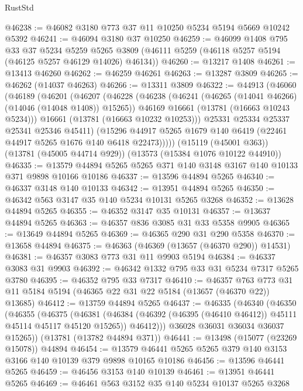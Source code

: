 \begin{lexlean}{RustStd}
\begin{coremodule}
@46238 := @46082 @3180 @773 @37 @11 @10250 @5234 @5194 @5669 @10242 @5392
@46241 := @46094 @3180 @37 @10250
@46259 := @46099
    @1408
    @795
    @33
    @37
    @5234
    @5259
    @5265
    @3809
    (@46111 @5259 (@46118 @5257 @5194 (@46125 @5257 @46129 @14026) @46134))
@46260 := @13217 @1408
@46261 := @13413 @46260
@46262 := @46259 @46261
@46263 := @13287 @3809
@46265 := @46262 (@14037 @46263)
@46266 := @13311 @3809
@46322 := @44913
    (@46060
      (@46189
        (@46201
          (@46207
            (@46228
              (@46238
                (@46241 (@46265 (@14041 @46266) (@14046 (@14048 @1408)) @15265))
                @46169
                @16661
                (@13781 (@16663 @10243 @5234)))
              @16661
              (@13781 (@16663 @10232 @10253)))
            @25331
            @25334
            @25337
            @25341
            @25346
            @45411)
          (@15296 @44917 @5265 @1679 @140 @6419 (@22461 @44917 @5265 @1676 @140 @6418 @22473)))))
    (@15119 (@45001 @363))
    (@13781 (@45005 @44714 @929))
    (@13573 (@15384 @1076 @10122 @44910))
@46335 := @13579 @44894 @5265 @5265 @371 @140 @3148 @3167 @140 @10133 @371 @9898 @10166 @10186
@46337 := @13596 @44894 @5265
@46340 := @46337 @3148 @140 @10133
@46342 := @13951 @44894 @5265
@46350 := @46342 @563 @3147 @35 @140 @5234 @10131 @5265 @3268
@46352 := @13628 @44894 @5265
@46355 := @46352 @3147 @35 @10131
@46357 := @13637 @44894 @5265
@46363 := @46357 @836 @3085 @31 @33 @5358 @9905
@46365 := @13649 @44894 @5265
@46369 := @46365 @290 @31 @290 @5358
@46370 := @13658 @44894
@46375 := @46363 (@46369 (@13657 (@46370 @290)) @14531)
@46381 := @46357 @3083 @773 @31 @11 @9903 @5194
@46384 := @46337 @3083 @31 @9903
@46392 := @46342 @1332 @795 @33 @31 @5234 @7317 @5265 @3780
@46395 := @46352 @795 @33 @7317
@46410 := @46357
    @763
    @773
    @31
    @11
    @5184
    @5194
    (@46365 @22 @31 @22 @5184 (@13657 (@46370 @22)) @13685)
@46412 := @13759 @44894 @5265
@46437 := @46335
    (@46340
      (@46350
        (@46355
          (@46375
            (@46381
              (@46384 (@46392 (@46395 (@46410 @46412)) @45111 @45114 @45117 @45120 @15265))
              @46412)))
        @36028
        @36031
        @36034
        @36037
        @15265))
    (@13781 (@13782 @44894 @371))
@46441 := @13498 (@15077 (@23269 @15078)) @44894
@46454 := @13579 @46441 @5265 @5265 @379 @140 @3153 @3166 @140 @10139 @379 @9898 @10165 @10186
@46456 := @13596 @46441 @5265
@46459 := @46456 @3153 @140 @10139
@46461 := @13951 @46441 @5265
@46469 := @46461 @563 @3152 @35 @140 @5234 @10137 @5265 @3268

\end{coremodule}
\end{lexlean}
